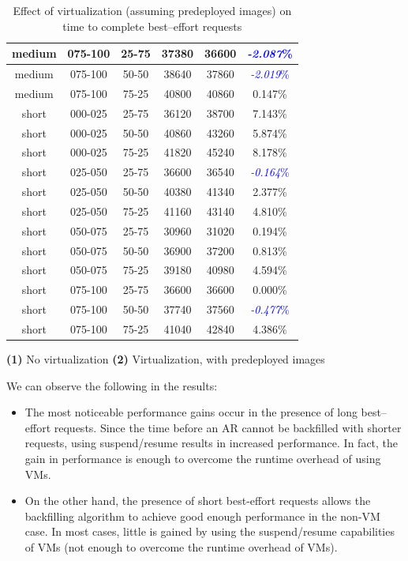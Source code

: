 \begin{table}
\begin{center}
\begin{tabular}{|c|c|c|c|c|c|}
\\\hline
medium & 075-100 & 25-75 & 37380 & 36600 & \textcolor{blue}{\textit{-2.087}\%}
\\\hline
medium & 075-100 & 50-50 & 38640 & 37860 & \textcolor{blue}{\textit{-2.019}\%}
\\\hline
medium & 075-100 & 75-25 & 40800 & 40860 & 0.147\%
\\\hline
short & 000-025 & 25-75 & 36120 & 38700 & 7.143\%
\\\hline
short & 000-025 & 50-50 & 40860 & 43260 & 5.874\%
\\\hline
short & 000-025 & 75-25 & 41820 & 45240 & 8.178\%
\\\hline
short & 025-050 & 25-75 & 36600 & 36540 & \textcolor{blue}{\textit{-0.164}\%}
\\\hline
short & 025-050 & 50-50 & 40380 & 41340 & 2.377\%
\\\hline
short & 025-050 & 75-25 & 41160 & 43140 & 4.810\%
\\\hline
short & 050-075 & 25-75 & 30960 & 31020 & 0.194\%
\\\hline
short & 050-075 & 50-50 & 36900 & 37200 & 0.813\%
\\\hline
short & 050-075 & 75-25 & 39180 & 40980 & 4.594\%
\\\hline
short & 075-100 & 25-75 & 36600 & 36600 & 0.000\%
\\\hline
short & 075-100 & 50-50 & 37740 & 37560 & \textcolor{blue}{\textit{-0.477}\%}
\\\hline
short & 075-100 & 75-25 & 41040 & 42840 & 4.386\%
\\\hline
\end{tabular}

\textbf{(1)} No virtualization 
\textbf{(2)} Virtualization, with predeployed images
\caption{Effect of virtualization (assuming predeployed images) on time to complete best--effort requests}
\label{tab:noVMvsPredeploy}
\end{center}
\end{table}

We can observe the following in the results:
\begin{itemize}
\item The most noticeable performance gains occur in the presence of long best--effort requests. Since the time before an AR cannot be backfilled with shorter requests, using suspend/resume results in increased performance. In fact, the gain in performance is enough to overcome the runtime overhead of using VMs.
\item On the other hand, the presence of short best-effort requests allows the backfilling algorithm to achieve good enough performance in the non-VM case. In most cases, little is gained by using the suspend/resume capabilities of VMs (not enough to overcome the runtime overhead of VMs).
\end{itemize}

